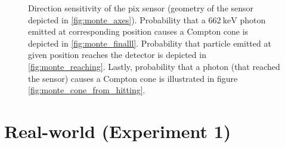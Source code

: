 \begin{figure}[!htb]
{    \label{fig:monte_reaching}
  }
  \caption{Direction sensitivity of the \ac{pix} sensor (geometry of the sensor depicted in \ref{fig:monte_axes}). 
  Probability that a $\SI{662}{\kilo\electronvolt}$ photon emitted at corresponding position causes a Compton cone is depicted in \ref{fig:monte_finalll}. 
  Probability that particle emitted at given position reaches the detector is depicted in \ref{fig:monte_reaching}. 
  Lastly, probability that a photon (that reached the sensor) causes a Compton cone is illustrated in figure \ref{fig:monte_cone_from_hitting}. }
  \label{fig:monte_clar}
\end{figure}%

\newpage
\section{Real-world (Experiment 1)}%


